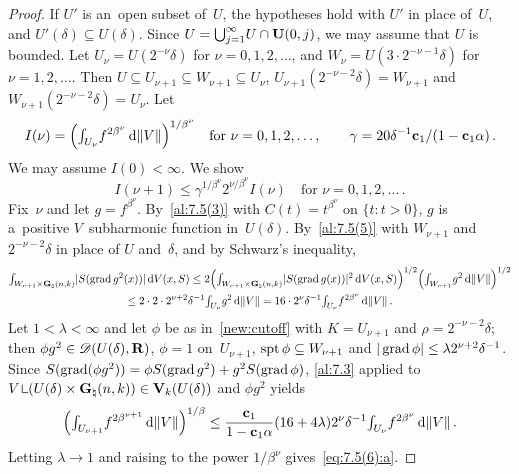 \begin{proof}
    If $U'$ is an~open subset of~$U$, the hypotheses hold with $U'$ in place of~$U$, and $U'(\delta)
    \subseteq U(\delta)$. Since $U = {{\textstyle \bigcup}}_{j=1}^\infty U \cap \mathbf{U}(0,j)$, we may assume that
    $U$ is bounded. Let $U_\nu = U(2^{-\nu} \delta)$ for $\nu = 0, 1, 2, \ldots$, and $W_\nu =
    U(3 \cdot 2^{-\nu-1} \delta)$ for $\nu = 1, 2, \ldots$. Then $U \subseteq U_{\nu+1} \subseteq
    W_{\nu+1} \subseteq U_\nu$, $U_{\nu+1}(2^{-\nu-2} \delta) = W_{\nu+1}$ and $W_{\nu+1}(2^{-\nu-2}
    \delta) = U_\nu$. Let
    \begin{displaymath}
        I(\nu) = \Big( {\textstyle\int_{U_\nu}^{}} f^{2 \beta^\nu} \,\mathrm{d} \|V\| \Big)^{1/\beta^\nu} \quad
        \text{for $\nu = 0, 1, 2, \ldots$} \,, \qquad \gamma = 20 \delta^{-1} \mathbf{c}_1 / (1 -
        \mathbf{c}_1 \alpha) \,.
    \end{displaymath}
    We may assume $I(0) < \infty$. We show
    \begin{equation}
        \label{eq:7.5(6):a}
        I(\nu + 1) \le \gamma^{1/\beta^\nu} 2^{\nu / \beta^\nu} I(\nu) \quad \text{for $\nu = 0,
        1, 2, \ldots$} \,.
    \end{equation}
    Fix~$\nu$ and let $g = f^{\beta^\nu}$. By~\ref{al:7.5(3)} with $C(t) = t^{\beta^\nu}$ on $\{ t
    : t > 0 \}$, $g$ is a~positive $V$~subharmonic function in~$U(\delta)$. By~\ref{al:7.5(5)} with
    $W_{\nu+1}$ and $2^{-\nu-2} \delta$ in place of $U$ and~$\delta$, and by Schwarz's inequality,
    \begin{multline*}
        {\textstyle\int_{W_{\nu+1} \times \mathbf{G}_{\natural}(n,k)}^{}} |S(\operatorname{grad} g^2(x))| \,\mathrm{d} V(x,S) \le 2 \Big(
        {\textstyle\int_{W_{\nu+1} \times \mathbf{G}_{\natural}(n,k)}^{}} |S(\operatorname{grad} g(x))|^2 \,\mathrm{d} V(x,S) \Big)^{1/2}
        \Big( {\textstyle\int_{W_{\nu+1}}^{}} g^2 \,\mathrm{d} \|V\| \Big)^{1/2} \\ \le 2 \cdot 2 \cdot 2^{\nu+2}
        \delta^{-1} {\textstyle\int_{U_\nu}^{}} g^2 \,\mathrm{d} \|V\| = 16 \cdot 2^\nu \delta^{-1} {\textstyle\int_{U_\nu}^{}}
        f^{2\beta^\nu} \,\mathrm{d} \|V\| \,.
    \end{multline*}
    Let $1 < \lambda < \infty$ and let $\phi$ be as in~\ref{new:cutoff} with $K = U_{\nu+1}$ and
    $\rho = 2^{-\nu-2} \delta$; then $\phi g^2 \in \mathscr{D}(U(\delta),\mathbf{R})$, $\phi = 1$
    on~$U_{\nu+1}$, $\operatorname{spt} \phi \subseteq W_{\nu+1}$ and $|\operatorname{grad} \phi| \le \lambda 2^{\nu+2}
    \delta^{-1}$. Since $S(\operatorname{grad}(\phi g^2)) = \phi S(\operatorname{grad} g^2) + g^2 S(\operatorname{grad} \phi)$,
    \ref{al:7.3} applied to $V \restrict (U(\delta) \times \pgrass{\adim}{\vdim}) \in
    \Var{\vdim}(U(\delta))$ and $\phi g^2$ yields
    \begin{displaymath}
        \Big( {\textstyle\int_{U_{\nu+1}}^{}} f^{2 \beta^{\nu+1}} \,\mathrm{d} \|V\| \Big)^{1/\beta} \le
        \frac{\mathbf{c}_1}{1 - \mathbf{c}_1 \alpha} (16 + 4 \lambda) 2^\nu \delta^{-1}
        {\textstyle\int_{U_\nu}^{}} f^{2 \beta^\nu} \,\mathrm{d} \|V\| \,.
    \end{displaymath}
    Letting $\lambda \to 1$ and raising to the power $1/\beta^\nu$ gives~\eqref{eq:7.5(6):a}.


\end{proof}
